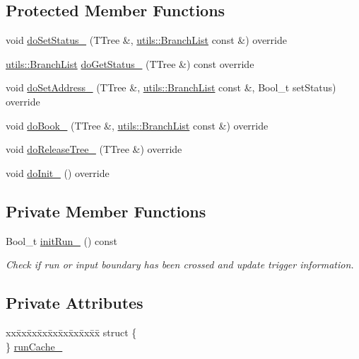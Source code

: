 \subsection*{Protected Member Functions}
\begin{DoxyCompactItemize}
\item 
void \hyperlink{classpanda_1_1Event_a714f9999480dd623a883560e62717d85}{doSetStatus\_\-} (TTree \&, \hyperlink{classpanda_1_1utils_1_1BranchList}{utils::BranchList} const \&) override
\item 
\hyperlink{classpanda_1_1utils_1_1BranchList}{utils::BranchList} \hyperlink{classpanda_1_1Event_a1bd8a01f111c4e14a921a560caef6821}{doGetStatus\_\-} (TTree \&) const override
\item 
void \hyperlink{classpanda_1_1Event_abe96424e8e74474e69a0f7bee8b6d38e}{doSetAddress\_\-} (TTree \&, \hyperlink{classpanda_1_1utils_1_1BranchList}{utils::BranchList} const \&, Bool\_\-t setStatus) override
\item 
void \hyperlink{classpanda_1_1Event_a3c20f40e1f37f947a5e977c38c53febb}{doBook\_\-} (TTree \&, \hyperlink{classpanda_1_1utils_1_1BranchList}{utils::BranchList} const \&) override
\item 
void \hyperlink{classpanda_1_1Event_a63ef383a11be99bbf46771468557c89a}{doReleaseTree\_\-} (TTree \&) override
\item 
void \hyperlink{classpanda_1_1Event_a7907201dc93916ed71696bc276793c80}{doInit\_\-} () override
\end{DoxyCompactItemize}
\subsection*{Private Member Functions}
\begin{DoxyCompactItemize}
\item 
Bool\_\-t \hyperlink{classpanda_1_1Event_af555a708697c8a69575d69d6800ae458}{initRun\_\-} () const 
\begin{DoxyCompactList}\small\item\em Check if run or input boundary has been crossed and update trigger information. \item\end{DoxyCompactList}\end{DoxyCompactItemize}
\subsection*{Private Attributes}
\begin{DoxyCompactItemize}
\item 
\begin{tabbing}
xx\=xx\=xx\=xx\=xx\=xx\=xx\=xx\=xx\=\kill
struct \{\\
\} \hyperlink{classpanda_1_1Event_a5ed40e8ab1d0bfcabb64fa24f4eebeb6}{runCache\_}\\

\end{tabbing}\end{DoxyCompactItemize}


